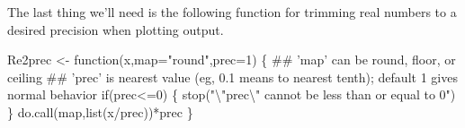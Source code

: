 \documentclass[11pt,]{article}
\newenvironment{Shaded}{}{}
\newcommand{\KeywordTok}[1]{\textcolor[rgb]{0.00,0.00,1.00}{#1}}
\newcommand{\DataTypeTok}[1]{#1}
\newcommand{\DecValTok}[1]{#1}
\newcommand{\CharTok}[1]{\textcolor[rgb]{0.00,0.50,0.50}{#1}}
\newcommand{\StringTok}[1]{\textcolor[rgb]{0.00,0.50,0.50}{#1}}
\newcommand{\ControlFlowTok}[1]{\textcolor[rgb]{0.00,0.00,1.00}{#1}}
\newcommand{\OperatorTok}[1]{#1}
\newcommand{\NormalTok}[1]{#1}
\begin{document}
\begin{Shaded}
\end{Shaded}

The last thing we'll need is the following function for trimming real
numbers to a desired precision when plotting output.

\begin{Shaded}
\begin{Highlighting}[]
\NormalTok{Re2prec <-}\StringTok{ }\ControlFlowTok{function}\NormalTok{(x,}\DataTypeTok{map=}\StringTok{"round"}\NormalTok{,}\DataTypeTok{prec=}\DecValTok{1}\NormalTok{) \{}
\NormalTok{  ## 'map' can be round, floor, or ceiling}
\NormalTok{  ## 'prec' is nearest value (eg, 0.1 means to nearest tenth); default 1 gives normal behavior}
  \ControlFlowTok{if}\NormalTok{(prec}\OperatorTok{<=}\DecValTok{0}\NormalTok{) \{ }\KeywordTok{stop}\NormalTok{(}\StringTok{"}\CharTok{\textbackslash{}"}\StringTok{prec}\CharTok{\textbackslash{}"}\StringTok{ cannot be less than or equal to 0"}\NormalTok{) \}}
  \KeywordTok{do.call}\NormalTok{(map,}\KeywordTok{list}\NormalTok{(x}\OperatorTok{/}\NormalTok{prec))}\OperatorTok{*}\NormalTok{prec}
\NormalTok{\}}
\end{Highlighting}
\end{Shaded}
\end{document}
